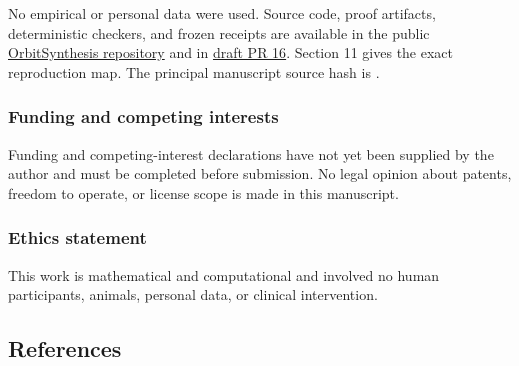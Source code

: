 \documentclass[
  11pt,
]{article}
\theoremstyle{definition}
\theoremstyle{remark}
\begin{document}
No empirical or personal data were used. Source code, proof artifacts,
deterministic checkers, and frozen receipts are available in the public
\href{https://github.com/TheDarkLightX/OrbitSynthesis}{OrbitSynthesis
repository} and in
\href{https://github.com/TheDarkLightX/OrbitSynthesis/pull/16}{draft PR
16}. Section 11 gives the exact reproduction map. The principal
manuscript source hash is
\texttt{}.

\hypertarget{funding-and-competing-interests}{%
\subsubsection*{Funding and competing
interests}\label{funding-and-competing-interests}}

Funding and competing-interest declarations have not yet been supplied
by the author and must be completed before submission. No legal opinion
about patents, freedom to operate, or license scope is made in this
manuscript.

\hypertarget{ethics-statement}{%
\subsubsection*{Ethics statement}\label{ethics-statement}}

This work is mathematical and computational and involved no human
participants, animals, personal data, or clinical intervention.

\hypertarget{references}{%
\subsection*{References}\label{references}}
\end{document}
